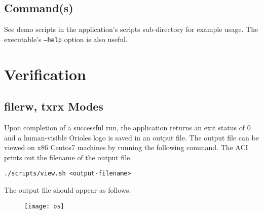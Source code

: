   \subsection{Command(s)}

    See demo scripts in the application's scripts
    sub-directory\cite{github_scripts_dir}
    for example
    usage. The executable's \texttt{--help} option is also useful.

\section{Verification}

  \subsection{filerw, txrx Modes}
    Upon completion of a successful run, the application returns an exit status
    of
    0
    and a human-visible Orioles logo is saved in an output file. The output file
    can
    be viewed on x86 Centos7 machines by running the following command. The
    ACI
    prints out the filename of the output file.
    \begin{lstlisting}
./scripts/view.sh <output-filename>
    \end{lstlisting}
    \noindent The output file should appear as follows.
    \begin{center}
      \begin{figure}[h]
        \centering\captionsetup{type=figure}\texttt{[image: os]}
        \label{fig:blockdiagram}
      \end{figure}
    \end{center}



